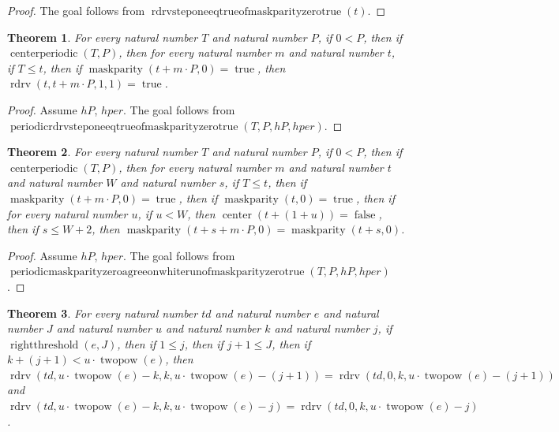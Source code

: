 \documentclass[11pt]{article}
\newtheorem{theorem}{Theorem}[section]
\theoremstyle{definition}
\begin{document}
\begin{proof}
The goal follows from \(\operatorname{rdrvsteponeeqtrueofmaskparityzerotrue}(t)\).
\end{proof}
\begin{theorem}
\label{ll:paper:periodic-rdrv-step-one-eq-true-of-maskparity-zero-true}
For every natural number \(T\) and natural number \(P\), if \(0 < P\), then if \(\operatorname{centerperiodic}(T, P)\), then for every natural number \(m\) and natural number \(t\), if \(T \le t\), then if \(\operatorname{maskparity}(t + m \cdot P, 0) = \operatorname{true}\), then \(\operatorname{rdrv}(t, t + m \cdot P, 1, 1) = \operatorname{true}\).
\end{theorem}
\begin{proof}
Assume \(hP\), \(hper\).
The goal follows from \(\operatorname{periodicrdrvsteponeeqtrueofmaskparityzerotrue}(T, P, hP, hper)\).
\end{proof}
\begin{theorem}
\label{ll:paper:periodic-maskparity-zero-agree-on-white-run-of-maskparity-zero-true}
For every natural number \(T\) and natural number \(P\), if \(0 < P\), then if \(\operatorname{centerperiodic}(T, P)\), then for every natural number \(m\) and natural number \(t\) and natural number \(W\) and natural number \(s\), if \(T \le t\), then if \(\operatorname{maskparity}(t + m \cdot P, 0) = \operatorname{true}\), then if \(\operatorname{maskparity}(t, 0) = \operatorname{true}\), then if for every natural number \(u\), if \(u < W\), then \(\operatorname{center}(t + (1 + u)) = \operatorname{false}\), then if \(s \le W + 2\), then \(\operatorname{maskparity}(t + s + m \cdot P, 0) = \operatorname{maskparity}(t + s, 0)\).
\end{theorem}
\begin{proof}
Assume \(hP\), \(hper\).
The goal follows from \(\operatorname{periodicmaskparityzeroagreeonwhiterunofmaskparityzerotrue}(T, P, hP, hper)\).
\end{proof}
\begin{theorem}
\label{ll:paper:rdrv-two-col-eq-white-seed-of-zero-gap}
For every natural number \(td\) and natural number \(e\) and natural number \(J\) and natural number \(u\) and natural number \(k\) and natural number \(j\), if \(\operatorname{rightthreshold}(e, J)\), then if \(1 \le j\), then if \(j + 1 \le J\), then if \(k + (j + 1) < u \cdot \operatorname{twopow}(e)\), then \(\operatorname{rdrv}(td, u \cdot \operatorname{twopow}(e) - k, k, u \cdot \operatorname{twopow}(e) - (j + 1)) = \operatorname{rdrv}(td, 0, k, u \cdot \operatorname{twopow}(e) - (j + 1))\) and \(\operatorname{rdrv}(td, u \cdot \operatorname{twopow}(e) - k, k, u \cdot \operatorname{twopow}(e) - j) = \operatorname{rdrv}(td, 0, k, u \cdot \operatorname{twopow}(e) - j)\).
\end{theorem}
\end{document}
